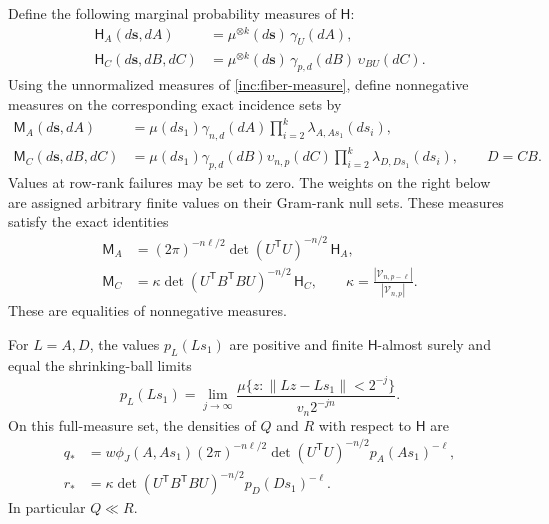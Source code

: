 \begin{lemma}
\label{inc:densities}
Define the following marginal probability measures of \(\mathsf H\):
\[
 \begin{split}
 \mathsf H_A(d\mathbf s,dA)
   &=\mu^{\otimes k}(d\mathbf s)\,\gamma_U(dA),\\
 \mathsf H_C(d\mathbf s,dB,dC)
   &=\mu^{\otimes k}(d\mathbf s)\,\gamma_{p,d}(dB)\,\upsilon_{BU}(dC).
 \end{split}
\]
Using the unnormalized measures of \eqref{inc:fiber-measure}, define
nonnegative measures on the corresponding exact incidence sets by
\begin{align}
 \mathsf M_A(d\mathbf s,dA)
  &=\mu(ds_1)\gamma_{n,d}(dA)
       \prod_{i=2}^k\lambda_{A,As_1}(ds_i),\label{inc:MA}\\
 \mathsf M_C(d\mathbf s,dB,dC)
  &=\mu(ds_1)\gamma_{p,d}(dB)\upsilon_{n,p}(dC)
       \prod_{i=2}^k\lambda_{D,Ds_1}(ds_i),\qquad D=CB.\label{inc:MC}
\end{align}
Values at row-rank failures may be set to zero.  The weights on the
right below are assigned arbitrary finite values on their Gram-rank
null sets.  These measures satisfy the exact identities
\begin{align}
 \mathsf M_A
  &=(2\pi)^{-n\ell/2}\det(U^{\mathsf T}U)^{-n/2}\,\mathsf H_A,
       \label{inc:undivided-A}\\
 \mathsf M_C
  &=\kappa\det(U^{\mathsf T}B^{\mathsf T}BU)^{-n/2}\,\mathsf H_C,
 \qquad
 \kappa=\frac{|\mathcal V_{n,p-\ell}|}{|\mathcal V_{n,p}|}.
       \label{inc:undivided-C}
\end{align}
These are equalities of nonnegative measures.

For \(L=A,D\), the values \(p_L(Ls_1)\) are positive and finite
\(\mathsf H\)-almost surely and equal the shrinking-ball limits
\[
 p_L(Ls_1)=\lim_{j\to\infty}
 \frac{\mu\{z:\|Lz-Ls_1\|<2^{-j}\}}{v_n2^{-jn}}.
\]
On this full-measure set, the densities of \(Q\) and \(R\) with respect
to \(\mathsf H\) are
\begin{align}
 q_*&=w\phi_J(A,As_1)(2\pi)^{-n\ell/2}
       \det(U^{\mathsf T}U)^{-n/2}p_A(As_1)^{-\ell},
       \label{inc:q-density}\\
 r_*&=\kappa\det(U^{\mathsf T}B^{\mathsf T}BU)^{-n/2}
       p_D(Ds_1)^{-\ell}.\label{inc:r-density}
\end{align}
In particular \(Q\ll R\).
\end{lemma}

